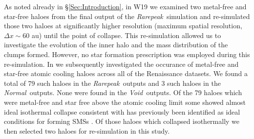 \documentclass[graphics, twocolumn, usenatbib]{mn2e}
\newcommand{\rarepeak} {\textit{Rarepeak~}}
\newcommand{\normal} {\textit{Normal~}}
\newcommand{\void} {\textit{Void~}}
\begin{document}
 As noted already in \S \ref{Sec:Introduction}, in W19 we examined two metal-free and star-free
 haloes from the final output of the \rarepeak simulation and re-simulated those two haloes at
 significantly higher resolution (maximum spatial resolution, $\Delta x \sim 60$ au) until the
 point of collapse. This re-simulation allowed us to investigate the evolution of the inner halo
 and the mass distribution of the clumps formed. However, no star formation prescription was
 employed during this re-simulation. In \cite{Regan_2020} we subsequently investigated the occurance
 of metal-free and star-free atomic cooling haloes across all of the Renaissance datasets. We found
 a total of 79 such haloes in the
 \rarepeak outputs and 3 such haloes in the \normal outputs. None were found in the \void outputs.
 Of the 79 haloes which were metal-free and star free above the atomic cooling limit some
 showed almost ideal isothermal collapse consistent with has previously been identified
 as ideal conditions for forming SMSs \citep{Inayoshi_2014, Becerra_2015, Latif_2016a,
   Regan_2017, Chon_2017b, Regan_2018b}. Of those haloes which collapsed isothermally we then
 selected two haloes for re-simulation in this study. \\
\end{document}
